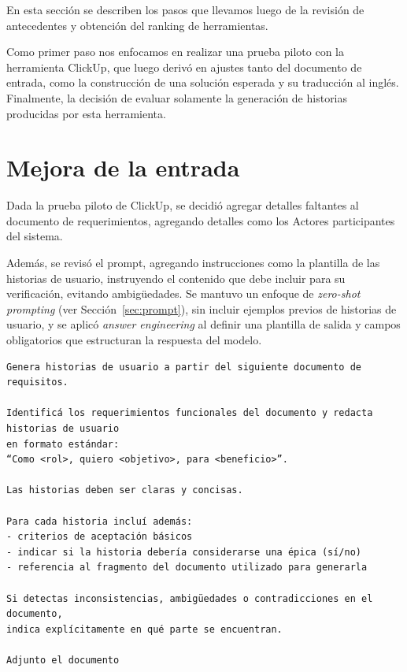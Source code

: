 
En esta sección se describen los pasos que llevamos luego de la revisión de antecedentes y obtención del ranking de herramientas.

Como primer paso nos enfocamos en realizar una prueba piloto con la herramienta ClickUp, que luego derivó en ajustes tanto del documento de entrada, como la construcción de una solución esperada y su traducción al inglés. Finalmente, la decisión de evaluar solamente la generación de historias producidas por esta herramienta.



\section{Mejora de la entrada}\label{sec:mejora-entrada}

Dada la prueba piloto de ClickUp, se decidió agregar detalles faltantes al documento de requerimientos, agregando detalles como los Actores participantes del sistema.

Además, se revisó el prompt, agregando instrucciones como la plantilla de las historias de usuario, instruyendo el contenido que debe incluir para su verificación, evitando ambigüedades. Se mantuvo un enfoque de \textit{zero-shot prompting} (ver Sección~\ref{sec:prompt}), sin incluir ejemplos previos de historias de usuario, y se aplicó \textit{answer engineering} al definir una plantilla de salida y campos obligatorios que estructuran la respuesta del modelo.

\begin{verbatim}
Genera historias de usuario a partir del siguiente documento de requisitos.

Identificá los requerimientos funcionales del documento y redacta historias de usuario
en formato estándar:
“Como <rol>, quiero <objetivo>, para <beneficio>”.

Las historias deben ser claras y concisas.

Para cada historia incluí además:
- criterios de aceptación básicos
- indicar si la historia debería considerarse una épica (sí/no)
- referencia al fragmento del documento utilizado para generarla

Si detectas inconsistencias, ambigüedades o contradicciones en el documento,
indica explícitamente en qué parte se encuentran.

Adjunto el documento
\end{verbatim}

